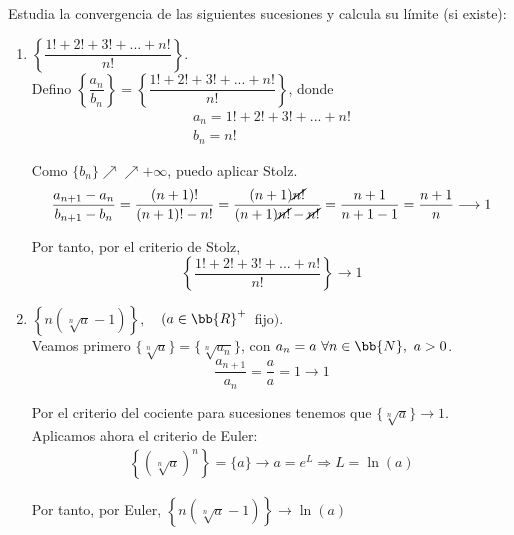 \documentclass[12pt]{article}
\begin{document}
    \begin{ejercicio}[3 puntos]
        Estudia la convergencia de las siguientes sucesiones y calcula su límite (si existe):
        \begin{enumerate}
            \item $\left\{ \dfrac{1!+2!+3!+...+n!}{n!} \right\}$.\\

            Defino $\left\{ \dfrac{a_n}{b_n}\right\} = \left\{ \dfrac{1!+2!+3!+...+n!}{n!} \right\}$, donde
            \begin{gather*}
                a_n = 1!+2!+3!+...+n! \\
                b_n = n!
            \end{gather*}

            Como $\{b_n\} \nearrow \nearrow + \infty$, puedo aplicar Stolz.
            \begin{equation*}
                \dfrac{a_{n+1}-a_n}{b_{n+1}-b_n} = \dfrac{(n+1)!}{(n+1)! - n!} = \dfrac{(n+1)\cancel{n!}}{(n+1)\cancel{n!} - \cancel{n!}} = \dfrac{n+1}{n+1-1} = \dfrac{n+1}{n}\longrightarrow 1
            \end{equation*}

            Por tanto, por el criterio de Stolz,
            \[
                \left\{ \dfrac{1!+2!+3!+...+n!}{n!} \right\} \longrightarrow 1
            \]
            
            \item $\left\{ n(\sqrt[n]{a}-1) \right\}, \,\,$ $\,\, (a\in \bb{R}^+\,$ fijo$)$.\\

            Veamos primero $\{\sqrt[n]{a}\}= \{\sqrt[n]{a_n}\}$, con $a_n=a \,\, \forall n \in \bb{N}, \,\, a > 0$.
            \[
            \dfrac{a_{n+1}}{a_n}=\dfrac{a}{a}=1 \longrightarrow 1
            \]

            Por el criterio del cociente para sucesiones tenemos que $\{\sqrt[n]{a}\}\longrightarrow 1$.\\

            Aplicamos ahora el criterio de Euler:
            \begin{gather*}
                \left\{ (\sqrt[n]{a})^n\right\} = \{a\} \longrightarrow a=e^L \Longrightarrow L=\ln(a)
            \end{gather*}

            Por tanto, por Euler, $\left\{ n(\sqrt[n]{a}-1) \right\} \longrightarrow \ln(a)$\\
            

\end{enumerate}
\end{ejercicio}
\end{document}

